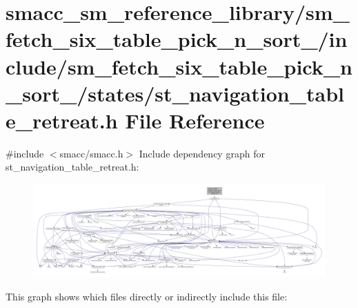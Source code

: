 \hypertarget{sm__fetch__six__table__pick__n__sort__1_2include_2sm__fetch__six__table__pick__n__sort__1_2state03ddcc1bc3396adeb10de8392f4e0ef3}{}\section{smacc\+\_\+sm\+\_\+reference\+\_\+library/sm\+\_\+fetch\+\_\+six\+\_\+table\+\_\+pick\+\_\+n\+\_\+sort\+\_/include/sm\+\_\+fetch\+\_\+six\+\_\+table\+\_\+pick\+\_\+n\+\_\+sort\+\_/states/st\+\_\+navigation\+\_\+table\+\_\+retreat.h File Reference}
\label{sm__fetch__six__table__pick__n__sort__1_2include_2sm__fetch__six__table__pick__n__sort__1_2state03ddcc1bc3396adeb10de8392f4e0ef3}
{\ttfamily \#include $<$smacc/smacc.\+h$>$}\newline
Include dependency graph for st\+\_\+navigation\+\_\+table\+\_\+retreat.\+h\+:
\nopagebreak
\begin{figure}[H]
\begin{center}
\leavevmode
\includegraphics[width=350pt]{sm__fetch__six__table__pick__n__sort__1_2include_2sm__fetch__six__table__pick__n__sort__1_2state173e196a8770ca6ba7cf88d4716f7b60}
\end{center}
\end{figure}
This graph shows which files directly or indirectly include this file\+:
\nopagebreak
